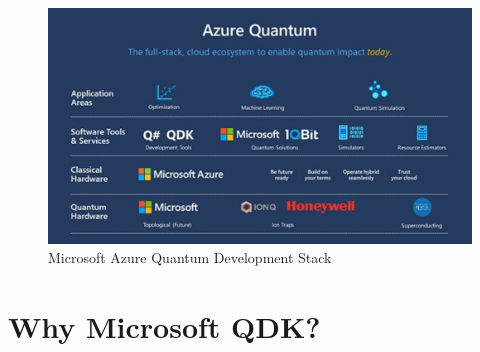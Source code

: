 \documentclass[english,a4paper,11pt,oneside,onecolumn]{book}
\begin{document}
\begin{figure}[H]
    \centering
    \includegraphics[scale=0.5]{Images/MicrosoftQDKStack.png}
    \caption{Microsoft Azure Quantum Development Stack}
    \label{fig:msQStack}
\end{figure}

\section{Why Microsoft QDK?}
\label{sec:motvQdk}
\end{document}
